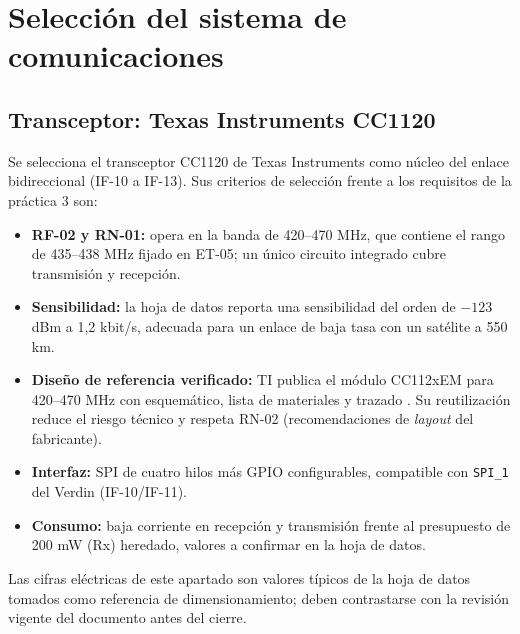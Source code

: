\documentclass[11pt,letterpaper]{article}
\begin{document}
\section{Selección del sistema de comunicaciones}
\label{sec:com}
\subsection{Transceptor: Texas Instruments CC1120}
Se selecciona el transceptor CC1120 de Texas Instruments \cite{cc1120} como núcleo del enlace bidireccional (IF-10 a IF-13). Sus criterios de selección frente a los requisitos de la práctica 3 \cite{lab3} son:
\begin{itemize}
\item \textbf{RF-02 y RN-01:} opera en la banda de 420--470 MHz, que contiene el rango de 435--438 MHz fijado en ET-05; un único circuito integrado cubre transmisión y recepción.
\item \textbf{Sensibilidad:} la hoja de datos reporta una sensibilidad del orden de $-123$ dBm a 1,2 kbit/s, adecuada para un enlace de baja tasa con un satélite a 550 km.
\item \textbf{Diseño de referencia verificado:} TI publica el módulo CC112xEM para 420--470 MHz con esquemático, lista de materiales y trazado \cite{cc1120em}. Su reutilización reduce el riesgo técnico y respeta RN-02 (recomendaciones de \emph{layout} del fabricante).
\item \textbf{Interfaz:} SPI de cuatro hilos más GPIO configurables, compatible con \texttt{SPI\_1} del Verdin (IF-10/IF-11).
\item \textbf{Consumo:} baja corriente en recepción y transmisión frente al presupuesto de 200 mW (Rx) heredado, valores a confirmar en la hoja de datos.
\end{itemize}
Las cifras eléctricas de este apartado son valores típicos de la hoja de datos tomados como referencia de dimensionamiento; deben contrastarse con la revisión vigente del documento antes del cierre.
\end{document}
